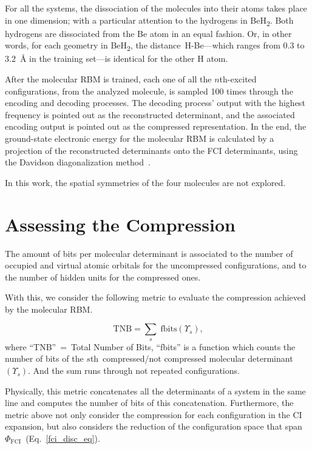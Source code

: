 \documentclass[%
 amsmath,amssymb,
 aps,prl, %
 reprint,%
]{revtex4-1}
\begin{document}
\indent For all the systems, the dissociation of the molecules into their atoms takes place in one dimension; with a particular attention to the hydrogens in BeH\textsubscript{2}. Both hydrogens are dissociated from the Be atom in an equal fashion. Or, in other words, for each geometry in BeH\textsubscript{2}, the distance~H-Be---which ranges from 0.3 to 3.2~\r{A} in the training set---is identical for the other H atom.

\indent After the molecular RBM is trained, each one of all the $n$th-excited configurations, from the analyzed molecule, is sampled 100 times through the encoding and decoding processes. The decoding process' output with the highest frequency is pointed out as the reconstructed determinant, and the associated encoding output is pointed out as the compressed representation. In the end, the ground-state electronic energy for the molecular RBM is calculated by a projection of the reconstructed determinants onto the FCI determinants, using the Davidson diagonalization method~\cite{Davidson1975,Leininger2001,Sun2017}. 

\indent In this work, the spatial symmetries of the four molecules are not explored.

\hypertarget{sec:assessing_compression}{}
\section{Assessing the Compression}

\indent The amount of bits per molecular determinant is associated to the number of occupied and virtual atomic orbitals for the uncompressed configurations, and to the number of hidden units for the compressed ones.

\indent With this, we consider the following metric to evaluate the compression achieved by the molecular RBM.

\begin{equation}
\text{TNB}=\sum_{s}\;\text{fbits}\left(\varUpsilon_{s}\right)\text{,}
\label{tnb_equation}
\end{equation}
where ``TNB''~=~Total Number of Bits, ``fbits'' is a function which counts the number of bits of the $s$th~compressed/not compressed molecular determinant~$(\varUpsilon_{s})$. And the sum runs through not repeated configurations.

\indent Physically, this metric concatenates all the determinants of a system in the same line and computes the number of bits of this concatenation. Furthermore, the metric above not only consider the compression for each configuration in the CI expansion, but also considers the reduction of the configuration space that span $\Phi_{\text{FCI}}$~(Eq.~\ref{fci_disc_eq}). 
\end{document}

